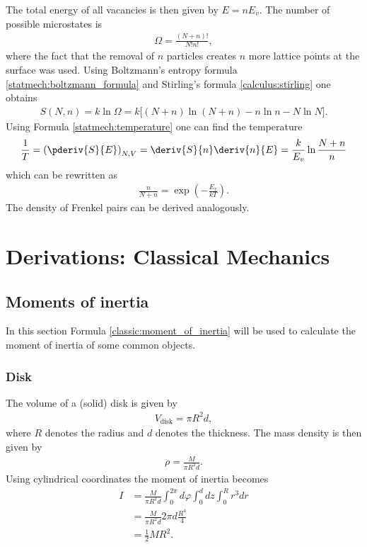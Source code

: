     The total energy of all vacancies is then given by $E = nE_v$. The number of possible microstates is
    \begin{gather}
        \Omega = \frac{(N+n)!}{N!n!},
    \end{gather}
    where the fact that the removal of $n$ particles creates $n$ more lattice points at the surface was used. Using Boltzmann's entropy formula \eqref{statmech:boltzmann_formula} and Stirling's formula \ref{calculus:stirling} one obtains
    \begin{gather}
        S(N,n) = k\ln\Omega = k\big[(N+n)\ln(N+n) -n\ln n - N\ln N \big].
    \end{gather}
    Using Formula \ref{statmech:temperature} one can find the temperature
    \begin{gather}
        \frac{1}{T} = \left(\pderiv{S}{E}\right)_{N, V} = \deriv{S}{n}\deriv{n}{E} = \frac{k}{E_v}\ln\frac{N+n}{n}
    \end{gather}
    which can be rewritten as
    \begin{gather}
        \frac{n}{N + n} = \exp\left(-\frac{E_v}{kT}\right).
    \end{gather}
    The density of Frenkel pairs can be derived analogously.

\chapter{Derivations: Classical Mechanics}

\section{Moments of inertia}\label{deriv:inertia}

    In this section Formula \ref{classic:moment_of_inertia} will be used to calculate the moment of inertia of some common objects.

\subsection{Disk}

    The volume of a (solid) disk is given by
    \begin{gather}
        V_\mathrm{disk} = \pi R^2d,
    \end{gather}
    where $R$ denotes the radius and $d$ denotes the thickness. The mass density is then given by
    \begin{gather}
        \rho = \frac{M}{\pi R^2d}.
    \end{gather}
    Using cylindrical coordinates the moment of inertia becomes
    \begin{align}
        I &= \frac{M}{\pi R^2d}\int_0^{2\pi}d\varphi\int_0^ddz\int_0^Rr^3dr\nonumber\\
        &= \frac{M}{\pi R^2d}2\pi d\frac{R^4}{4}\nonumber\\
        &= \frac{1}{2}MR^2.
    \end{align}

